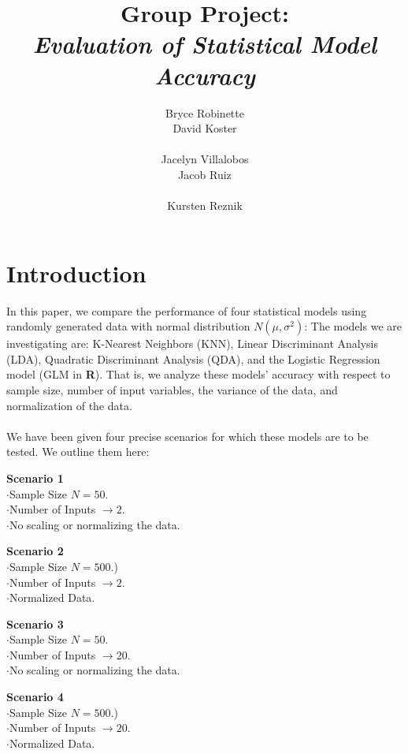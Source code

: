\documentclass[11pt, oneside]{article}
\title{Group Project:\\
\emph{Evaluation of Statistical Model Accuracy}
}
\author{\hspace{0.0cm}\parbox[t][2.5cm][t]{4cm}{
	Bryce Robinette\\
	David Koster\\
}
\parbox[t][2.5cm][t]{4cm}{
	Jacelyn Villalobos\\
	Jacob Ruiz\\
}
Kursten Reznik 
}
\date{}
\begin{document}
\maketitle




\section*{Introduction}
In this paper, we compare the performance of four statistical models using randomly generated data with normal distribution $N(\mu, \sigma^2)$: The models we are investigating are: K-Nearest Neighbors (KNN), Linear Discriminant Analysis (LDA), Quadratic Discriminant Analysis (QDA), and the Logistic Regression model (GLM in \textbf\textsf{R}). That is, we analyze these models' accuracy with respect to sample size, number of input variables, the variance of the data, and normalization of the data.\\
\\
We have been given four precise scenarios for which these models are to be tested. We outline them here:\\


\hspace{1.5cm}\parbox[t][2.5cm][t]{8cm}{
	\textbf{Scenario 1}\\
	$\cdot$Sample Size $N = 50.$\\
	$\cdot$Number of Inputs $\rightarrow 2$.\\
	$\cdot$No scaling or normalizing the data.
}
\parbox[t][2.5cm][t]{8cm}{
	\textbf{Scenario 2}\\
	$\cdot$Sample Size $N = 500.$)\\
	$\cdot$Number of Inputs $\rightarrow 2$.\\
	$\cdot$Normalized Data.
}

\hspace{1.5cm}\parbox[t][2.5cm][t]{8cm}{
	\textbf{Scenario 3}\\
	$\cdot$Sample Size $N = 50.$\\
	$\cdot$Number of Inputs $\rightarrow 20$.\\
	$\cdot$No scaling or normalizing the data.
}
\parbox[t][2.5cm][t]{8cm}{
	\textbf{Scenario 4}\\
	$\cdot$Sample Size $N = 500.$)\\
	$\cdot$Number of Inputs $\rightarrow 20$.\\
	$\cdot$Normalized Data.
}
\end{document}
